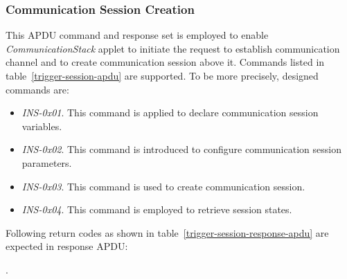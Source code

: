 \subsubsection{Communication Session Creation}\label{secSessionOpen}


This APDU command and response set is employed to enable \emph{CommunicationStack} applet to initiate the request to establish communication channel and to create communication session above it. Commands listed in table~\ref{trigger-session-apdu} are supported. To be more precisely, designed commands are: 

\begin{itemize}
\item \emph{INS-0x01}. This command is applied to declare communication session variables.
\item \emph{INS-0x02}. This command is introduced to configure communication session parameters.
\item \emph{INS-0x03}. This command is used to create communication session.
\item \emph{INS-0x04}. This command is  employed to retrieve session states.
\end{itemize}
\begin{table}[!htb]
\caption{Communication session creation command APDUs}
\label{trigger-session-apdu}
\end{table}


Following return codes as shown in table~\ref{trigger-session-response-apdu} are expected in response APDU:

.\begin{table}[!htb]
\caption{Trigger Session Return Code}
\label{trigger-session-response-apdu}
\end{table}


